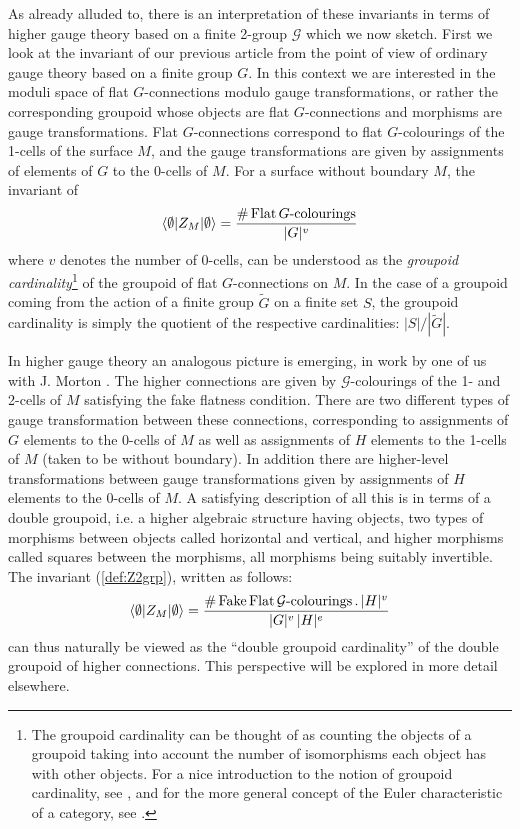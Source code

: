 \documentclass[a4paper,11pt]{article}
\def \G {\mathcal{G}}
\begin{document}
As already alluded to, there is an interpretation of these invariants in terms of higher gauge theory based on a finite 2-group $\G$ which we now sketch. First we look at the invariant of our previous article \cite{bp1} from the point of view of ordinary gauge theory based on a finite group $G$. In this context we are interested in the moduli space of flat $G$-connections modulo gauge transformations, or rather the corresponding groupoid whose objects are flat $G$-connections and morphisms are gauge transformations. Flat $G$-connections correspond to flat $G$-colourings of the 1-cells of the surface $M$, and the gauge transformations are given by assignments of elements of $G$ to the 0-cells of $M$. For a surface without boundary $M$, the invariant of \cite{bp1} 
$$
\langle \emptyset |Z_M| \emptyset \rangle
= 
\frac{\#\, {\rm Flat}\,  G{\text -}{\rm colourings}}{|G|^v}
$$
where $v$ denotes the number of 0-cells, can be understood as the {\em groupoid cardinality}\footnote{ The groupoid cardinality can be thought of as counting the objects of a groupoid taking into account the number of isomorphisms each object has with other objects. For a nice introduction to the notion of groupoid cardinality, see \cite{tao}, and for the more general concept of the Euler characteristic of a category, see \cite{lei}. } of the groupoid of flat $G$-connections on $M$. In the case of a groupoid coming from the action of a finite group $\widetilde{G}$ on a finite set $S$, the groupoid cardinality is simply the quotient of the respective cardinalities: $|S|/|\widetilde{G}|$.

In higher gauge theory an analogous picture is emerging, in work by one of us with J. Morton \cite{mp1,mp2}. The higher connections are given by $\G$-colourings of the 1- and 2-cells of $M$ satisfying the fake flatness condition. There are two different types of gauge transformation between these connections, corresponding to assignments of $G$ elements to the 0-cells of $M$ as well as assignments of $H$ elements to the 1-cells of $M$ (taken to be without boundary). In addition there are higher-level transformations between gauge transformations given by assignments of $H$ elements to the 0-cells of $M$. A satisfying description of all this is in terms of a double groupoid, i.e. a higher algebraic structure having objects, two types of morphisms between objects called horizontal and vertical, and higher morphisms called squares between the morphisms, all morphisms being suitably invertible. The invariant (\ref{def:Z2grp}), written as follows:
 $$
\langle \emptyset |Z_M| \emptyset \rangle
= 
\frac{\#\, {\rm Fake}\, {\rm Flat}\,  \G{\text -}{\rm colourings}\, .	\, {|H|^v}}{|G|^v\, |H|^e}
$$
can thus naturally be viewed as the ``double groupoid cardinality'' of the double groupoid of higher connections. This perspective will be explored in more detail elsewhere.
\end{document}
